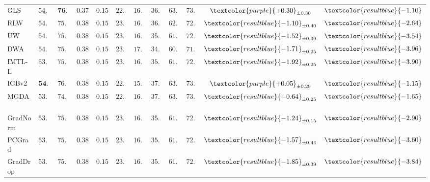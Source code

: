 \begin{table}[t]
{\begin{tabular}{lccccccccccc}
GLS~\citep{chennupati2019GLS} & $\underline{54.59}$ & $\textbf{76.06}$ & $0.3785$ & $0.1555$ & $22.71$ & $16.07$ & $36.89$ & $63.11$ & $73.81$ & $\textcolor{purple}{+0.30}_{\pm0.30}$   &  $\textcolor{resultblue}{-1.10}$                        \\
RLW~\citep{lin22RLW} & $54.04$ & $75.58$ & $0.3827$ & $0.1588$ & $23.07$ & $16.49$ & $36.12$ & $62.08$ & $72.94$ & $\textcolor{resultblue}{-1.10}_{\pm0.40}$            &   $\textcolor{resultblue}{-2.64}$                       \\
UW~\citep{kendall2018UW} & $54.29$ & $75.64$ & $0.3815$ & $0.1583$ & $23.48$ & $16.92$ & $35.26$ & $61.17$ & $72.21$ & $\textcolor{resultblue}{-1.52}_{\pm0.39}$   &    $\textcolor{resultblue}{-3.54}$                 \\
DWA~\citep{liu2019DWA} & $54.06$ & $75.64$ & $0.3820$ & $0.1564$ & $23.70$ & $17.11$ & $34.90$ & $60.74$ & $71.81$ & $\textcolor{resultblue}{-1.71}_{\pm0.25}$                          &   $\textcolor{resultblue}{-3.96}$                      \\
IMTL-L~\citep{liu2021IMTL} & $53.89$ & $75.54$ & $0.3834$ & $0.1591$ & $23.54$ & $16.98$ & $35.09$ & $61.06$ & $72.12$ & $\textcolor{resultblue}{-1.92}_{\pm0.25}$       &   $\textcolor{resultblue}{-3.90}$                       \\
IGBv2~\citep{dai2023IGBv2} & $\textbf{54.61}$  & $76.00$  & $0.3817$     & $0.1576$   & $22.68$    & $15.98$     & $37.14$   & $63.25$    & $73.87$                  & $\textcolor{purple}{+0.05}_{\pm0.29}$      &      $\textcolor{resultblue}{-1.15}$                    \\
\midrule
MGDA~\citep{desideri12MGDA}  & $53.52$ & $74.76$ & $0.3852$ & $0.1566$ & $22.74$ & $16.00$ & $37.12$ & $63.22$ & $73.84$ & $\textcolor{resultblue}{-0.64}_{\pm0.25}$   &    $\textcolor{resultblue}{-1.65}$           \\
GradNorm~\citep{chen2018GradNorm} & $53.91$ & $75.38$ & $0.3842$ & $0.1571$ & $23.17$ & $16.62$ & $35.80$ & $61.90$ & $72.84$ & $\textcolor{resultblue}{-1.24}_{\pm0.15}$  &  $\textcolor{resultblue}{-2.90}$                  \\
PCGrad~\citep{yu2020PCGrad} & $53.94$ & $75.62$ & $0.3804$ & $0.1578$ & $23.52$ & $16.93$ & $35.19$ & $61.17$ & $72.19$ & $\textcolor{resultblue}{-1.57}_{\pm0.44}$    &  $\textcolor{resultblue}{-3.60}$                \\
GradDrop~\citep{chen2020GradDrop} & $53.73$ & $75.54$ & $0.3837$ & $0.1580$ & $23.54$ & $16.96$ & $35.17$ & $61.06$ & $72.07$ & $\textcolor{resultblue}{-1.85}_{\pm0.39}$    &  $\textcolor{resultblue}{-3.84}$              \\

\end{tabular}}
\end{table}
